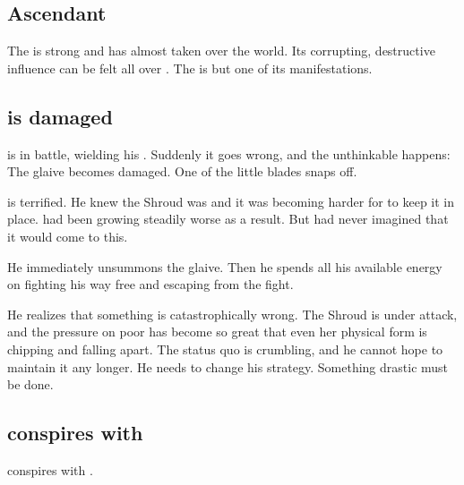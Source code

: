 \subsection{\Erebos \Matrix Ascendant}
The \bane{} \matrix{} is strong and has almost taken over the world. 
Its corrupting, destructive influence can be felt all over \Miith{}. 
The  is but one of its manifestations. 










\subsection{\Rystessakhin is damaged}
\Ishnaruchaefir{} is in battle, wielding his . 
Suddenly it goes wrong, and the unthinkable happens: 
The glaive becomes damaged. 
One of the little blades snaps off. 

\Ishnaruchaefir{} is terrified. 
He knew the Shroud was  and it was becoming harder for \Rystessakhin{} to keep it in place. 
 had been growing steadily worse as a result. 
But had never imagined that it would come to this. 

He immediately unsummons the glaive. 
Then he spends all his available energy on fighting his way free and escaping from the fight. 

He realizes that something is catastrophically wrong. 
The Shroud is under attack, and the pressure on poor \Rystessakhin{} has become so great that even her physical form is chipping and falling apart. 
The status quo is crumbling, and he cannot hope to maintain it any longer. 
He needs to change his strategy.
Something drastic must be done. 








\subsection{\Azraid conspires with \Ishnaruchaefir}
\Azraid{} conspires with \Ishnaruchaefir. 

